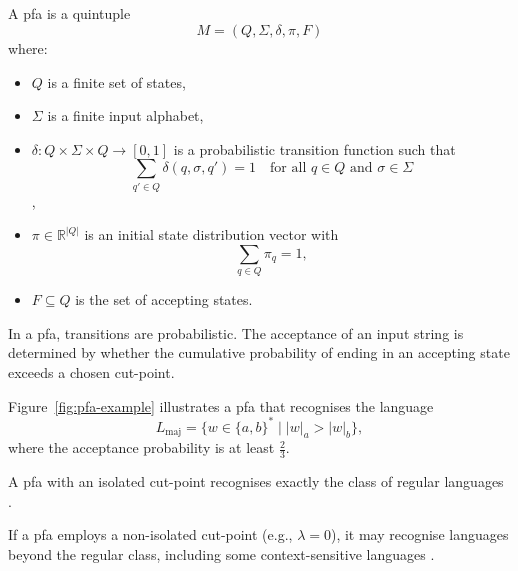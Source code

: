 \subsection{}
\label{subsec:pfa}

\begin{definition}
    A \gls{pfa} is a quintuple 
    \[
    M = (Q, \Sigma, \delta, \pi, F)
    \]
    where:
    \begin{itemize}
        \item \( Q \) is a finite set of states,
        \item \( \Sigma \) is a finite input alphabet,
        \item \( \delta: Q \times \Sigma \times Q \rightarrow [0,1] \) is a probabilistic transition function such that 
        \[
        \sum_{q' \in Q} \delta(q, \sigma, q') = 1 \quad \text{for all } q \in Q \text{ and } \sigma \in \Sigma
        \]\cite{rabin1963probabilistic},
        \item \( \pi \in \mathbb{R}^{|Q|} \) is an initial state distribution vector with 
        \[
        \sum_{q \in Q} \pi_q = 1,
        \]
        \item \( F \subseteq Q \) is the set of accepting states.
    \end{itemize}
\end{definition}

\begin{remark}
In a \gls{pfa}, transitions are probabilistic. The acceptance of an input string is determined by whether the cumulative probability of ending in an accepting state exceeds a chosen cut-point.
\end{remark}

\begin{example}
Figure~\ref{fig:pfa-example} illustrates a \gls{pfa} that recognises the language 
\[
L_{\text{maj}} = \{ w \in \{a,b\}^* \mid |w|_a > |w|_b \},
\]
where the acceptance probability is at least \( \frac{2}{3} \).
\end{example}

\begin{theorem}
    \label{thm:rabin}
    A \gls{pfa} with an isolated cut-point recognises exactly the class of regular languages \cite{rabin1963probabilistic}.
\end{theorem}

\begin{proposition}
    If a \gls{pfa} employs a non-isolated cut-point (e.g., \(\lambda = 0\)), it may recognise languages beyond the regular class, including some context-sensitive languages \cite{paz1971introduction}.
\end{proposition}

